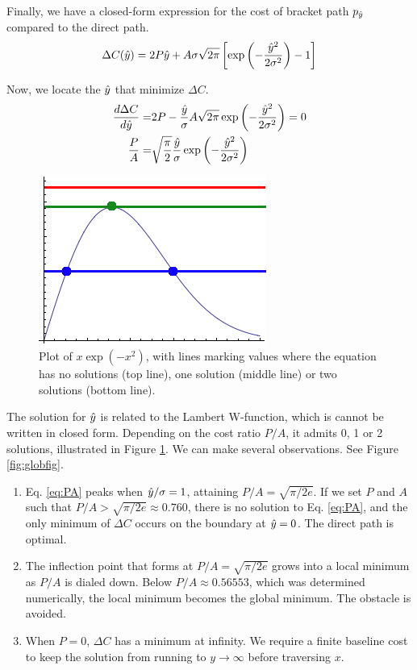 Finally, we have a closed-form expression for the cost of bracket path $p_{\hat{y}}$ compared to the direct path.
\begin{equation}
\Delta C(\hat{y}) = 2P\hat{y} + A\sigma\sqrt{2\pi}\left[\exp\left(-\frac{\hat{y}^2}{2\sigma^2}\right) - 1\right]
\end{equation}

Now, we locate the $\hat{y}$ that minimize $\Delta C$.
\begin{align}
\frac{d\Delta C}{d\yhat} = 
&2P - \frac{\yhat}{\sigma}A\sqrt{2\pi} \exp\left(-\frac{\yhat^2}{2\sigma^2} \right) = 0 \\
  \frac{P}{A} =& \sqrt{\frac{\pi}{2}} \frac{\yhat}{\sigma} \exp\left(-\frac{\yhat^2}{2\sigma^2} \right)
  \label{eq:PA}
\end{align}
\begin{figure}
\centering
\includegraphics[width=0.4\columnwidth]{graphix/lambert.png}
\caption{Plot of $x \exp(-x^2)$, with lines marking values where the equation has no solutions (top line), one solution (middle line) or two solutions (bottom line).}
\label{fig:lambert}
\end{figure}

The solution for $\hat{y}$ is related to the Lambert W-function, which is cannot be written in closed form.  Depending on the cost ratio $P/A$, it admits 0, 1 or 2 solutions, illustrated in Figure \ref{fig:lambert}. We can make several observations. See Figure \ref{fig:globfig}.
\begin{enumerate}
\item Eq. \ref{eq:PA} peaks when $\hat{y}/\sigma = 1$, attaining $P/A=\sqrt{\pi/2e}$. If we set $P$ and $A$ such that $P/A > \sqrt{\pi/2e} \approx 0.760$, there is no solution to Eq. \ref{eq:PA}, and the only minimum of $\Delta C$ occurs on the boundary at $\hat{y}=0$. The direct path is optimal.
\item The inflection point that forms at $P/A = \sqrt{\pi/2e}$ grows into a local minimum as $P/A$ is dialed down. Below $P/A \approx 0.56553$, which was determined numerically, the local minimum becomes the global minimum. The obstacle is avoided.
\item When $P=0$, $\Delta C$ has a minimum at infinity. We require a finite baseline cost to keep the solution from running to $y \rightarrow \infty$ before traversing $x$.
\end{enumerate}

